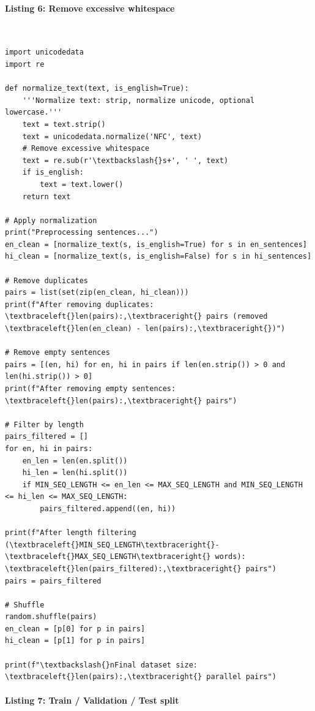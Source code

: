 \documentclass[12pt,a4paper,oneside]{report}
\begin{document}
\paragraph{Listing 6: Remove excessive whitespace}\mbox{}\\[-1ex]
\begin{Verbatim}[commandchars=\\\{\},breaklines=true,breakanywhere=true,fontsize=\scriptsize,frame=leftline,framesep=2mm,rulecolor=\color{gray}]
import unicodedata
import re

def normalize_text(text, is_english=True):
    '''Normalize text: strip, normalize unicode, optional lowercase.'''
    text = text.strip()
    text = unicodedata.normalize('NFC', text)
    # Remove excessive whitespace
    text = re.sub(r'\textbackslash{}s+', ' ', text)
    if is_english:
        text = text.lower()
    return text

# Apply normalization
print("Preprocessing sentences...")
en_clean = [normalize_text(s, is_english=True) for s in en_sentences]
hi_clean = [normalize_text(s, is_english=False) for s in hi_sentences]

# Remove duplicates
pairs = list(set(zip(en_clean, hi_clean)))
print(f"After removing duplicates: \textbraceleft{}len(pairs):,\textbraceright{} pairs (removed \textbraceleft{}len(en_clean) - len(pairs):,\textbraceright{})")

# Remove empty sentences
pairs = [(en, hi) for en, hi in pairs if len(en.strip()) > 0 and len(hi.strip()) > 0]
print(f"After removing empty sentences: \textbraceleft{}len(pairs):,\textbraceright{} pairs")

# Filter by length
pairs_filtered = []
for en, hi in pairs:
    en_len = len(en.split())
    hi_len = len(hi.split())
    if MIN_SEQ_LENGTH <= en_len <= MAX_SEQ_LENGTH and MIN_SEQ_LENGTH <= hi_len <= MAX_SEQ_LENGTH:
        pairs_filtered.append((en, hi))

print(f"After length filtering (\textbraceleft{}MIN_SEQ_LENGTH\textbraceright{}-\textbraceleft{}MAX_SEQ_LENGTH\textbraceright{} words): \textbraceleft{}len(pairs_filtered):,\textbraceright{} pairs")
pairs = pairs_filtered

# Shuffle
random.shuffle(pairs)
en_clean = [p[0] for p in pairs]
hi_clean = [p[1] for p in pairs]

print(f"\textbackslash{}nFinal dataset size: \textbraceleft{}len(pairs):,\textbraceright{} parallel pairs")
\end{Verbatim}
\paragraph{Listing 7: Train / Validation / Test split}\mbox{}\\[-1ex]
\end{document}
